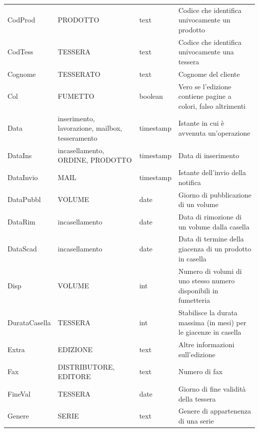 \documentclass[a4paper]{scrartcl}
\begin{document}
\begin{footnotesize}
\begin{longtable}{p{} p{} p{} p{}}
	CodProd &
	PRODOTTO &
	text &
	Codice che identifica univocamente un prodotto \\
	
	CodTess &
	TESSERA &
	text &
	Codice che identifica univocamente una tessera \\
	
	Cognome &
	TESSERATO &
	text &
	Cognome del cliente \\
	
	Col &
	FUMETTO &
	boolean &
	Vero se l'edizione contiene pagine a colori, falso altrimenti \\
	
	Data & 
	inserimento, lavorazione, mailbox, tesseramento &
	timestamp &
	Istante in cui è avvenuta un'operazione \\
	
	DataIns &
	incasellamento, ORDINE, PRODOTTO &
	timestamp &
	Data di inserimento \\
	
	DataInvio &
	MAIL &
	timestamp &
	Istante dell'invio della notifica \\
	
	DataPubbl &
	VOLUME &
	date &
	Giorno di pubblicazione di un volume \\
	
	DataRim &
	incasellamento &
	date &
	Data di rimozione di un volume dalla casella \\
	
	DataScad &
	incasellamento &
	date &
	Data di termine della giacenza di un prodotto in casella \\
	
	Disp &
	VOLUME &
	int &
	Numero di volumi di uno stesso numero disponibili in fumetteria \\
	
	DurataCasella &
	TESSERA &
	int &
	Stabilisce la durata massima (in mesi) per le giacenze in casella \\
	
	Extra &
	EDIZIONE &
	text &
	Altre informazioni sull'edizione \\
	
	Fax &
	DISTRIBUTORE, EDITORE &
	text &
	Numero di fax \\
	
	FineVal &
	TESSERA &
	date &
	Giorno di fine validità della tessera \\
	
	Genere &
	SERIE &
	text &
	Genere di appartenenza di una serie \\	


\end{longtable}
\end{footnotesize}
\end{document}
